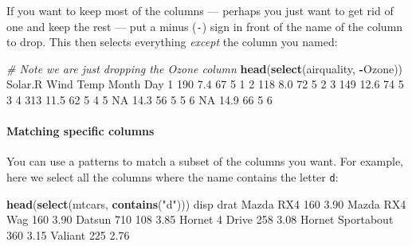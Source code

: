 \documentclass[]{article}
\newenvironment{Shaded}{\begin{snugshade}}{\end{snugshade}}
\newcommand{\CommentTok}[1]{\textcolor[rgb]{0.56,0.35,0.01}{\textit{#1}}}
\newcommand{\DecValTok}[1]{\textcolor[rgb]{0.00,0.00,0.81}{#1}}
\newcommand{\FloatTok}[1]{\textcolor[rgb]{0.00,0.00,0.81}{#1}}
\newcommand{\KeywordTok}[1]{\textcolor[rgb]{0.13,0.29,0.53}{\textbf{#1}}}
\newcommand{\NormalTok}[1]{#1}
\newcommand{\OperatorTok}[1]{\textcolor[rgb]{0.81,0.36,0.00}{\textbf{#1}}}
\newcommand{\OtherTok}[1]{\textcolor[rgb]{0.56,0.35,0.01}{#1}}
\newcommand{\StringTok}[1]{\textcolor[rgb]{0.31,0.60,0.02}{#1}}
\let\oldparagraph\paragraph
\renewcommand{\paragraph}[1]{\oldparagraph{#1}\mbox{}}
\begin{document}
If you want to keep most of the columns --- perhaps you just want to get rid of
one and keep the rest --- put a minus (\texttt{-}) sign in front of the name of the
column to drop. This then selects everything \emph{except} the column you named:

\begin{Shaded}
\begin{Highlighting}[]
\CommentTok{# Note we are just dropping the Ozone column}
\KeywordTok{head}\NormalTok{(}\KeywordTok{select}\NormalTok{(airquality, }\OperatorTok{-}\NormalTok{Ozone))}
\NormalTok{  Solar.R Wind Temp Month Day}
\DecValTok{1}     \DecValTok{190}  \FloatTok{7.4}   \DecValTok{67}     \DecValTok{5}   \DecValTok{1}
\DecValTok{2}     \DecValTok{118}  \FloatTok{8.0}   \DecValTok{72}     \DecValTok{5}   \DecValTok{2}
\DecValTok{3}     \DecValTok{149} \FloatTok{12.6}   \DecValTok{74}     \DecValTok{5}   \DecValTok{3}
\DecValTok{4}     \DecValTok{313} \FloatTok{11.5}   \DecValTok{62}     \DecValTok{5}   \DecValTok{4}
\DecValTok{5}      \OtherTok{NA} \FloatTok{14.3}   \DecValTok{56}     \DecValTok{5}   \DecValTok{5}
\DecValTok{6}      \OtherTok{NA} \FloatTok{14.9}   \DecValTok{66}     \DecValTok{5}   \DecValTok{6}
\end{Highlighting}
\end{Shaded}

\hypertarget{matching-specific-columns}{%
\paragraph{Matching specific columns}\label{matching-specific-columns}}

You can use a patterns to match a subset of the columns you want. For example,
here we select all the columns where the name contains the letter \texttt{d}:

\begin{Shaded}
\begin{Highlighting}[]
\KeywordTok{head}\NormalTok{(}\KeywordTok{select}\NormalTok{(mtcars, }\KeywordTok{contains}\NormalTok{(}\StringTok{"d"}\NormalTok{)))}
\NormalTok{                  disp drat}
\NormalTok{Mazda RX4          }\DecValTok{160} \FloatTok{3.90}
\NormalTok{Mazda RX4 Wag      }\DecValTok{160} \FloatTok{3.90}
\NormalTok{Datsun }\DecValTok{710}         \DecValTok{108} \FloatTok{3.85}
\NormalTok{Hornet }\DecValTok{4}\NormalTok{ Drive     }\DecValTok{258} \FloatTok{3.08}
\NormalTok{Hornet Sportabout  }\DecValTok{360} \FloatTok{3.15}
\NormalTok{Valiant            }\DecValTok{225} \FloatTok{2.76}
\end{Highlighting}
\end{Shaded}
\end{document}

